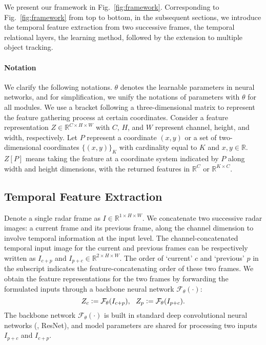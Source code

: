 \documentclass[10pt,twocolumn,letterpaper]{article}
\newcommand{\RR}{\mathbb{R}}
\newcommand{\defeq}{\vcentcolon=}
\begin{document}
We present our framework in Fig.~\ref{fig:framework}. Corresponding to Fig.~\ref{fig:framework} from top to bottom, in the subsequent sections, we introduce the temporal feature extraction from two successive frames, the temporal relational layers, the learning method, followed by the extension to multiple object tracking.



\vspace{-4.5mm}
\paragraph{Notation} We clarify the following notations. $\theta$ denotes the learnable parameters in neural networks, and for simplification, we unify the notations of parameters with $\theta$ for all modules. We use a bracket following a three-dimensional matrix to represent the feature gathering process at certain coordinates. Consider a feature representation $Z\in\RR^{C\times H\times W}$ with $C$, $H$, and $W$ represent channel, height, and width, respectively. Let $P$ represent a coordinate $(x,y)$ or a set of two-dimensional coordinates $\{(x,y)\}_K$ with cardinality equal to $K$ and $x, y\in\RR$. $Z[P]$ means taking the feature at a coordinate system indicated by $P$ along width and height dimensions, with the returned features in $\RR^C$ or $\RR^{K\times C}$.



\subsection{Temporal Feature Extraction}

Denote a single radar frame as $I\in\RR^{1\times H\times W}$. We concatenate two successive radar images: a current frame and its previous frame, along the channel dimension to involve temporal information at the input level. The channel-concatenated temporal input image for the current and previous frames can be respectively written as $I_{c+p}$ and $I_{p+c}\in\RR^{2\times H\times W}$. The order of `current' $c$ and `previous' $p$ in the subscript indicates the feature-concatenating order of these two frames. We obtain the feature representations for the two frames by forwarding the formulated inputs through a backbone neural network $\mathcal{F}_\theta(\cdot)$:
\begin{equation}
    Z_c \defeq \mathcal{F}_\theta(I_{c+p}),\ \ Z_p \defeq \mathcal{F}_\theta(I_{p+c}).
\end{equation}
The backbone network $\mathcal{F}_\theta(\cdot)$ is built in standard deep convolutional neural networks (\eg, ResNet), and model parameters are shared for processing two inputs $I_{p+c}$ and $I_{c+p}$.
\end{document}
